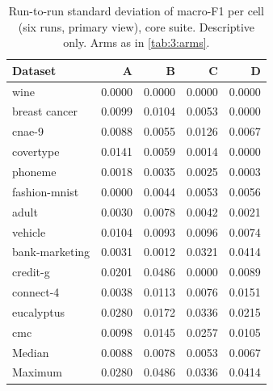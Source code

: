 \begin{table}[htbp]
  \centering
  \small
  \caption[Run-to-run standard deviation per cell]{Run-to-run standard deviation of macro-F1 per cell (six runs, primary view), core suite. Descriptive only. Arms as in \autoref{tab:3:arms}.}
  \label{tab:6:runsd}
  \begin{tabular}{lrrrr}
    \toprule
    Dataset & A & B & C & D \\
    \midrule
    wine & 0.0000 & 0.0000 & 0.0000 & 0.0000 \\
    breast cancer & 0.0099 & 0.0104 & 0.0053 & 0.0000 \\
    cnae-9 & 0.0088 & 0.0055 & 0.0126 & 0.0067 \\
    covertype & 0.0141 & 0.0059 & 0.0014 & 0.0000 \\
    phoneme & 0.0018 & 0.0035 & 0.0025 & 0.0003 \\
    fashion-mnist & 0.0000 & 0.0044 & 0.0053 & 0.0056 \\
    adult & 0.0030 & 0.0078 & 0.0042 & 0.0021 \\
    vehicle & 0.0104 & 0.0093 & 0.0096 & 0.0074 \\
    bank-marketing & 0.0031 & 0.0012 & 0.0321 & 0.0414 \\
    credit-g & 0.0201 & 0.0486 & 0.0000 & 0.0089 \\
    connect-4 & 0.0038 & 0.0113 & 0.0076 & 0.0151 \\
    eucalyptus & 0.0280 & 0.0172 & 0.0336 & 0.0215 \\
    cmc & 0.0098 & 0.0145 & 0.0257 & 0.0105 \\
    \midrule
    Median & 0.0088 & 0.0078 & 0.0053 & 0.0067 \\
    Maximum & 0.0280 & 0.0486 & 0.0336 & 0.0414 \\
    \bottomrule
  \end{tabular}
\end{table}
